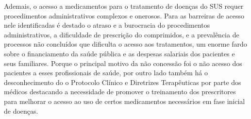 \documentclass[twoside]{article}
\begin{document}
\begin{multicols}{2}
Ademais, o acesso a medicamentos para o tratamento de doenças do SUS requer procedimentos administrativos complexos e onerosos. Para as barreiras de acesso nele identificadas é destado o atraso e a burocracia do
procedimentos administrativos, a dificuldade de prescrição do comprimidos, e a prevalência de processos não concluídos que dificulta o acesso aos tratamentos, um enorme fardo sobre o financiamento da saúde pública e as despesas salariais dos pacientes e seus familiares. Porque o principal motivo da não concessão foi o não acesso dos pacientes a esses profissionais de saúde, por outro lado também há o desconhecimento do o Protocolo Clínico e Diretrizes Terapêuticas  por parte dos médicos destacando a necessidade de promover o treinamento dos prescritores para melhorar o acesso ao uso de certos medicamentos necessários em fase inicial de doenças.





\end{multicols}
\end{document}
